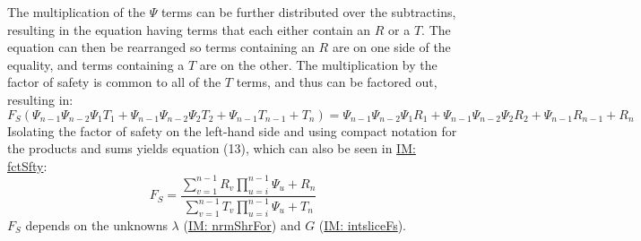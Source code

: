 \documentclass[12pt]{article}
\begin{document}
The multiplication of the $Ψ$ terms can be further distributed over the subtractins, resulting in the equation having terms that each either contain an $R$ or a $T$. The equation can then be rearranged so terms containing an $R$ are on one side of the equality, and terms containing a $T$ are on the other. The multiplication by the factor of safety is common to all of the $T$ terms, and thus can be factored out, resulting in:
\begin{displaymath}
{F_{S}} \left(Ψ_{n-1} Ψ_{n-2} Ψ_{1} T_{1}+Ψ_{n-1} Ψ_{n-2} Ψ_{2} T_{2}+Ψ_{n-1} T_{n-1}+T_{n}\right)=Ψ_{n-1} Ψ_{n-2} Ψ_{1} R_{1}+Ψ_{n-1} Ψ_{n-2} Ψ_{2} R_{2}+Ψ_{n-1} R_{n-1}+R_{n}
\end{displaymath}
Isolating the factor of safety on the left-hand side and using compact notation for the products and sums yields equation (13), which can also be seen in \hyperref[IM:fctSfty]{IM: fctSfty}:
\begin{displaymath}
{F_{S}}=\frac{\displaystyle\sum_{v=1}^{n-1}{R_{v} \displaystyle\prod_{u=i}^{n-1}{Ψ_{u}}}+R_{n}}{\displaystyle\sum_{v=1}^{n-1}{T_{v} \displaystyle\prod_{u=i}^{n-1}{Ψ_{u}}}+T_{n}}
\end{displaymath}
${F_{S}}$ depends on the unknowns $λ$ (\hyperref[IM:nrmShrFor]{IM: nrmShrFor}) and $G$ (\hyperref[IM:intsliceFs]{IM: intsliceFs}).
\par~
\end{document}
